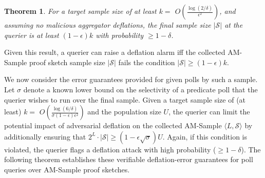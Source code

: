 \documentclass[10pt,twocolumn]{article}
\newcommand{\amsampl}{AM-Sample\xspace}
\newcommand{\proofsketch}{proof sketch\xspace}
\newcommand{\proofsketches}{proof sketches\xspace}
\newcommand{\csbbox}{\vrule height7pt width4pt depth1pt}
\newtheorem{theorem}{Theorem}
\newcommand\vpar{{\vspace*{0.3em}}}
\newcommand{\reportsubmission}[2]{#2}
\newcommand{\lsb}{\mbox{\tt lsb}}
\newcommand\calS{\ensuremath{\mathcal S}}
\providecommand{\prob}[1]{{\bf Pr}\left[ #1 \right]}
\begin{document}
\vspace{-5pt}
\begin{theorem}
For a target sample size of at least 
$k=$ $O(\frac{\log(2/\delta)}{\epsilon^2})$, and assuming no malicious 
aggregator deflations,  the final sample size $|\calS|$ at the querier 
is at least  $(1-\epsilon)k$ with probability $\geq 1-\delta$.
\label{thm:amsamplsize}
\end{theorem}

\vspace{-5pt}

\reportsubmission{

  \vpar\noindent
      {\bf Proof:}
      Let $l$ denote the (unique) bucket level such that $k<U/2^l \leq 2k$, and let 
      $X$ denote the (random) number of elements mapped to buckets at levels $\geq l$ 
      through our $\lsb(h())$ hash mappings. 
      Since we hash a total of $U$ distinct elements, by Chernoff bounds~\cite{MotwaniRaghavan1995}
      \begin{eqnarray*}
	\prob{X\in [(1-\epsilon)k, (1+\epsilon)2k]} &<& \prob{X\in(1\pm\epsilon)\frac{U}{2^l}} \\
	&<& 2 e^{-\epsilon^2 U/2^{l+1}}
	\ <\ 2 e^{-\epsilon^2 k/2}\ \leq\ \delta,
      \end{eqnarray*}
      since $k=$ $O(\frac{\log(2/\delta)}{\epsilon^2})$.
      Based on our aggregation scheme for \amsampl sketches (Figure~\ref{fig:distinctSample}),
      and assuming no malicious tampering, all elements mapping to levels $\geq l$ should 
      ``survive'' all the way to the querier node; 
      thus, the final sample size $|S|$ satisfies $|S|\geq X$ $\geq (1-\epsilon)k$ with 
      probability $\geq 1-\delta$.
      \hfill$\csbbox$

}{}

\noindent Given this result, a querier can raise a deflation alarm iff
the collected \amsampl \proofsketch sample size $|\calS|$ fails the
condition $|\calS|\geq (1-\epsilon)k$.

We now consider the error guarantees provided for given polls by such a sample.
Let $\sigma$ denote a known lower bound on the selectivity of a predicate
poll that the querier wishes to run over the final sample.
Given a target sample size of (at least) 
$k=$ $O(\frac{\log(6/\delta)}{\sigma (1-\epsilon)\epsilon^2})$ and
the population size $U$, the querier can limit the potential impact 
of adversarial deflation on the collected \amsampl 
$\langle L, \calS\rangle $  by additionally ensuring that $2^L\cdot|\calS|\geq (1-\epsilon\sqrt{\sigma}) U$.
Again, if this condition is violated, the querier flags a
deflation attack with high probability ($\geq 1-\delta$).
The following theorem establishes these verifiable deflation-error guarantees for
poll queries over \amsampl \proofsketches.
\end{document}
